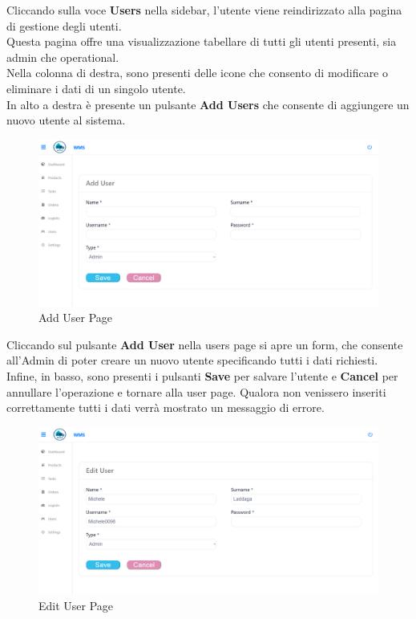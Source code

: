 Cliccando sulla voce \textbf{Users} nella sidebar, l'utente viene reindirizzato alla pagina di gestione degli utenti.\\
Questa pagina offre una visualizzazione tabellare di tutti gli utenti presenti, sia admin che operational.\\
Nella colonna di destra, sono presenti delle icone che consento di modificare o eliminare
i dati di un singolo utente.\\
In alto a destra è presente un pulsante \textbf{Add Users} che consente di aggiungere un nuovo utente al sistema.

\begin{figure}[H]
    \centering
    \includegraphics[width=\textwidth]{document/sections/img/Storyboard/addUserPage.png}
    \caption{Add User Page}
    \label{fig:addUserPages}
\end{figure}

Cliccando sul pulsante \textbf{Add User} nella users page si apre un form, che consente
all'Admin di poter creare un nuovo utente specificando tutti i dati richiesti.\\
Infine, in basso, sono presenti i pulsanti \textbf{Save} per salvare l'utente e \textbf{Cancel} per annullare l'operazione
e tornare alla user page.
Qualora non venissero inseriti correttamente tutti i dati verrà mostrato un messaggio di errore.

\begin{figure}[H]
    \centering
    \includegraphics[width=\textwidth]{document/sections/img/Storyboard/editUserPage.png}
    \caption{Edit User Page}
    \label{fig:editUserPage}
\end{figure}

